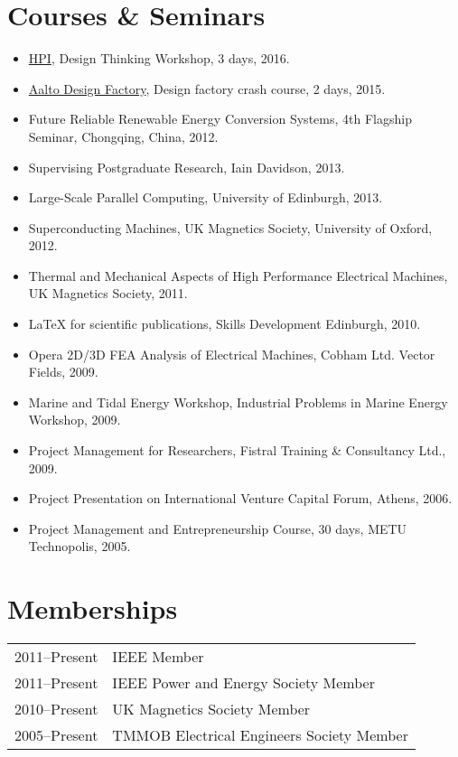 \documentclass[a4paper,12pt]{article}
\begin{document}
\section{Courses \& Seminars}
\begin{itemize}

\item \href{https://hpi.de/school-of-design-thinking.html}{HPI}, Design Thinking Workshop, 3 days, 2016.
\item \href{https://designfactory.aalto.fi/}{Aalto Design Factory}, Design factory crash course, 2 days, 2015.
\item Future Reliable Renewable Energy Conversion Systems, 4th Flagship Seminar, Chongqing, China, 2012.
\item Supervising Postgraduate Research, Iain Davidson, 2013. 
\item Large-Scale Parallel Computing, University of Edinburgh, 2013.
\item Superconducting Machines, UK Magnetics Society, University of Oxford, 2012.
\item Thermal and Mechanical Aspects of High Performance Electrical Machines, UK Magnetics Society, 2011.
\item LaTeX for scientific publications, Skills Development Edinburgh, 2010.
\item Opera 2D/3D FEA Analysis of Electrical Machines, Cobham Ltd. Vector Fields, 2009.
\item Marine and Tidal Energy Workshop, Industrial Problems in Marine Energy Workshop, 2009.
\item Project Management for Researchers, Fistral Training \& Consultancy Ltd., 2009.
\item Project Presentation on International Venture Capital Forum, Athens, 2006.
\item Project Management and Entrepreneurship Course, 30 days, METU Technopolis, 2005.
\end{itemize}


\section{Memberships}
\begin{tabular}{ll}
2011--Present & IEEE Member \\
2011--Present & IEEE Power and Energy Society Member \\
2010--Present & UK Magnetics Society Member\\
2005--Present & TMMOB Electrical Engineers Society Member\\
\end{tabular}
\end{document}
